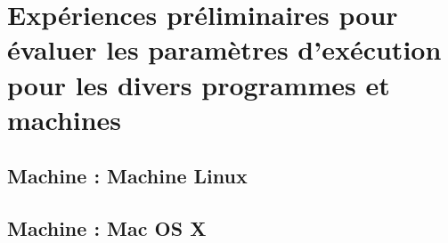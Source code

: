 
\chapter{Expériences préliminaires pour évaluer les paramètres
d'exécution pour les divers programmes et machines}
\label{graphes.ann}


\section{Machine : Machine Linux}






\section{Machine : Mac OS X}







